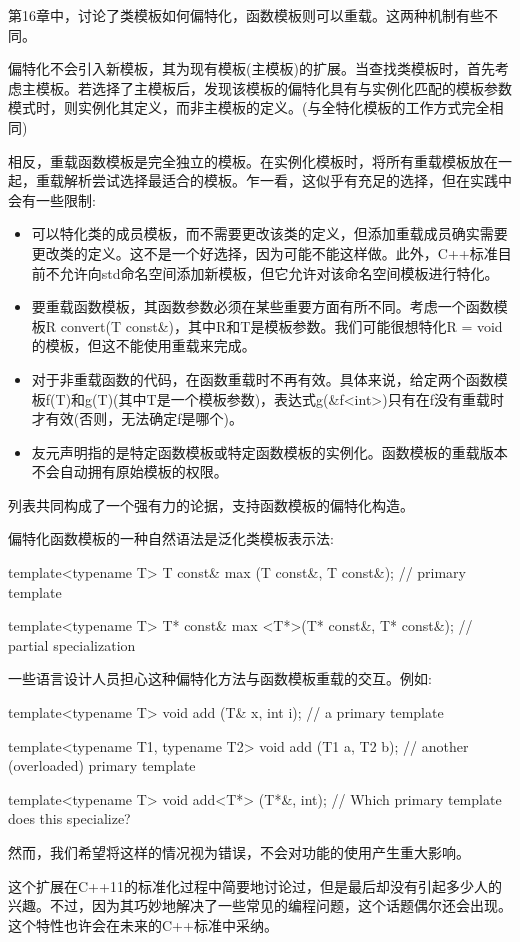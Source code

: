 
第16章中，讨论了类模板如何偏特化，函数模板则可以重载。这两种机制有些不同。

偏特化不会引入新模板，其为现有模板(主模板)的扩展。当查找类模板时，首先考虑主模板。若选择了主模板后，发现该模板的偏特化具有与实例化匹配的模板参数模式时，则实例化其定义，而非主模板的定义。(与全特化模板的工作方式完全相同)

相反，重载函数模板是完全独立的模板。在实例化模板时，将所有重载模板放在一起，重载解析尝试选择最适合的模板。乍一看，这似乎有充足的选择，但在实践中会有一些限制:

\begin{itemize}
\item 
可以特化类的成员模板，而不需要更改该类的定义，但添加重载成员确实需要更改类的定义。这不是一个好选择，因为可能不能这样做。此外，C++标准目前不允许向std命名空间添加新模板，但它允许对该命名空间模板进行特化。

\item 
要重载函数模板，其函数参数必须在某些重要方面有所不同。考虑一个函数模板R convert(T const\&)，其中R和T是模板参数。我们可能很想特化R = void的模板，但这不能使用重载来完成。

\item 
对于非重载函数的代码，在函数重载时不再有效。具体来说，给定两个函数模板f(T)和g(T)(其中T是一个模板参数)，表达式g(\&f<int>)只有在f没有重载时才有效(否则，无法确定f是哪个)。

\item 
友元声明指的是特定函数模板或特定函数模板的实例化。函数模板的重载版本不会自动拥有原始模板的权限。
\end{itemize}

列表共同构成了一个强有力的论据，支持函数模板的偏特化构造。

偏特化函数模板的一种自然语法是泛化类模板表示法:

\begin{cpp}
template<typename T>
T const& max (T const&, T const&); // primary template

template<typename T>
T* const& max <T*>(T* const&, T* const&); // partial specialization
\end{cpp}

一些语言设计人员担心这种偏特化方法与函数模板重载的交互。例如:

\begin{cpp}
template<typename T>
void add (T& x, int i); // a primary template

template<typename T1, typename T2>
void add (T1 a, T2 b); // another (overloaded) primary template

template<typename T>
void add<T*> (T*&, int); // Which primary template does this specialize?
\end{cpp}

然而，我们希望将这样的情况视为错误，不会对功能的使用产生重大影响。

这个扩展在C++11的标准化过程中简要地讨论过，但是最后却没有引起多少人的兴趣。不过，因为其巧妙地解决了一些常见的编程问题，这个话题偶尔还会出现。这个特性也许会在未来的C++标准中采纳。






















